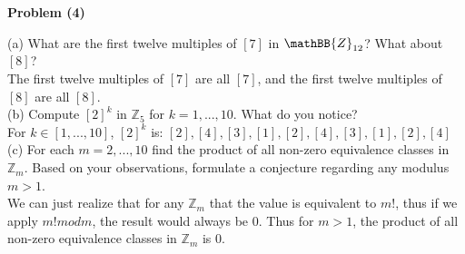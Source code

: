 \documentclass[20pt]{article}
\begin{document}
\noindent
\textbf{Problem (4)}\\
\begin{text}
    (a) What are the first twelve multiples of $[7]$ in $\mathBB{Z}_{12}$? What about $[8]$?\\
    
    \noindent
    The first twelve multiples of $[7]$ are all $[7]$, and the first twelve multiples of $[8]$ are all $[8]$.\\
    
    \noindent
    (b) Compute $[2]^k$ in $\mathbb{Z}_5$ for $k = 1, . . . , 10$. What do you notice?\\
    
    \noindent
    For $k \in [1, ... ,10]$, $[2]^k$ is: $[2], [4], [3], [1], [2], [4], [3], [1], [2], [4]$\\
    
    \noindent
    (c) For each $m = 2, . . . , 10$ find the product of all non-zero equivalence classes in $\mathbb{Z}_m$. Based on your observations, formulate a conjecture regarding any modulus $m > 1$.\\
    
    \noindent
    We can just realize that for any $\mathbb{Z}_m$ that the value is equivalent to $m!$, thus if we apply $m! mod m$, the result would always be 0. Thus for $m > 1$, the product of all non-zero equivalence classes in $\mathbb{Z}_m$ is 0.
\end{text}\\
\end{document}

